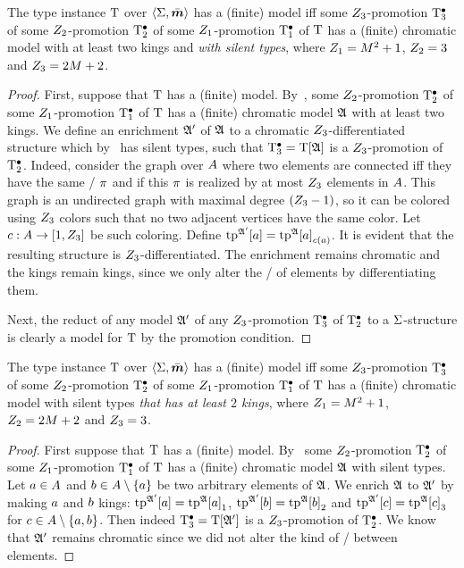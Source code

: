 \begin{remark}\label{rem:prop-silent}
The type instance $\mathrm{T}$ over $\left\langle \mathrm{\Sigma},\bar{\bm{m}} \right\rangle$ has a (finite) model
iff some $Z_{3}$-promotion $\mathrm{T}_{3}^{\bullet}$
of some $Z_{2}$-promotion $\mathrm{T}_{2}^{\bullet}$ 
of some $Z_{1}$-promotion $\mathrm{T}_{1}^{\bullet}$ 
of $\mathrm{T}$ has a (finite) chromatic model with at least two kings and
\emph{with silent types},
where $Z_{1} = M^2+1$, $Z_{2} = 3$ and $Z_{3} = 2M+2$.
\end{remark}
\begin{proof}
First, suppose that $\mathrm{T}$ has a (finite) model.
By~, some
$Z_{2}$-promotion $\mathrm{T}_{2}^{\bullet}$
of some $Z_{1}$-promotion $\mathrm{T}_{1}^{\bullet}$ of $\mathrm{T}$ has a (finite) chromatic model
$\mathfrak{A}$ with at least two kings.
We define an enrichment $\mathfrak{A'}$ of $\mathfrak{A}$ to a chromatic
$Z_{3}$-differentiated structure which by~ has silent types,
such that $\mathrm{T}_{3}^{\bullet} = \mathrm{T}[\mathfrak{A}]$ is a $Z_{3}$-promotion of $\mathrm{T}_{2}^{\bullet}$.
Indeed, consider the graph over $A$ where two elements are connected iff
they have the same \onetype/ $\pi$ and if this $\pi$ is realized by at most
$Z_{3}$ elements in $A$.
This graph is an undirected graph with maximal degree $(Z_{3}-1)$, so it can be
colored using $Z_{3}$ colors such that no two adjacent vertices have the same
color.
Let $c : A\to[1,Z_{3}]$ be such coloring.
Define $\operatorname{tp}^{\mathfrak{A'}}[a] = {\operatorname{tp}^{\mathfrak{A}}[a]}_{c(a)}$.
It is evident that the resulting structure is $Z_{3}$-differentiated.
The enrichment remains chromatic and the kings remain kings,
since we only alter the \onetypes/ of elements by differentiating them.

 Next, the reduct of any model $\mathfrak{A'}$ of any $Z_{3}$-promotion $\mathrm{T}_{3}^{\bullet}$ of
$\mathrm{T}_{2}^{\bullet}$ to a $\mathrm{\Sigma}$-structure is clearly a model for $\mathrm{T}$ by the promotion
condition.
\end{proof}

\begin{remark}\label{rem:prop-twokings}
The type instance $\mathrm{T}$ over $\left\langle \mathrm{\Sigma},\bar{\bm{m}} \right\rangle$ has a (finite) model
iff some $Z_{3}$-promotion $\mathrm{T}_{3}^{\bullet}$
of some $Z_{2}$-promotion $\mathrm{T}_{2}^{\bullet}$
of some $Z_{1}$-promotion $\mathrm{T}_{1}^{\bullet}$ 
of $\mathrm{T}$ has a (finite) chromatic model with silent types
\emph{that has at least $2$ kings},
where $Z_{1} = M^2+1$, $Z_{2} = 2M+2$ and $Z_{3} = 3$.
\end{remark}
\begin{proof}
First suppose that $\mathrm{T}$ has a (finite) model.
By~
some $Z_{2}$-promotion $\mathrm{T}_{2}^{\bullet}$
of some $Z_{1}$-promotion $\mathrm{T}_{1}^{\bullet}$
of $\mathrm{T}$ has a (finite) chromatic model $\mathfrak{A}$ with silent types.
Let $a\in A$ and $b\in A\setminus\left\{a\right\}$ be two arbitrary elements of
$\mathfrak{A}$. We enrich $\mathfrak{A}$ to $\mathfrak{A'}$ by making $a$ and $b$ kings:
$\operatorname{tp}^{\mathfrak{A'}}[a] = {\operatorname{tp}^{\mathfrak{A}}[a]}_{1}$,
$\operatorname{tp}^{\mathfrak{A'}}[b] = {\operatorname{tp}^{\mathfrak{A}}[b]}_{2}$
and $\operatorname{tp}^{\mathfrak{A'}}[c] = {\operatorname{tp}^{\mathfrak{A}}[c]}_{3}$ for $c\in A\setminus\left\{a,b\right\}$.
Then indeed $\mathrm{T}_{3}^{\bullet} = \mathrm{T}[\mathfrak{A'}]$ is a $Z_{3}$-promotion of $\mathrm{T}_{2}^{\bullet}$.
We know that $\mathfrak{A'}$ remains chromatic since we did not alter the kind of
\twotypes/ between elements.

\end{proof}


